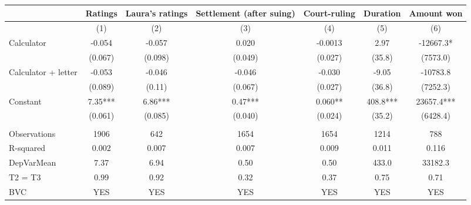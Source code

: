 \begin{tabular}{lcccccc}
\toprule
      & Ratings & Laura's ratings & Settlement (after suing) & Court-ruling & Duration & Amount won \\
\midrule
      & (1)   & (2)   & (3)   & (4)   & (5)   & (6) \\
\midrule
\midrule
Calculator & -0.054 & -0.057 & 0.020 & -0.0013 & 2.97  & -12667.3* \\
      & (0.067) & (0.098) & (0.049) & (0.027) & (35.8) & (7573.0) \\
Calculator + letter & -0.053 & -0.046 & -0.046 & -0.030 & -9.05 & -10783.8 \\
      & (0.089) & (0.11) & (0.067) & (0.027) & (36.8) & (7252.3) \\
Constant & 7.35*** & 6.86*** & 0.47*** & 0.060** & 408.8*** & 23657.4*** \\
      & (0.061) & (0.085) & (0.040) & (0.024) & (35.2) & (6428.4) \\
      &       &       &       &       &       &  \\
\midrule
Observations & 1906  & 642   & 1654  & 1654  & 1214  & 788 \\
R-squared & 0.002 & 0.007 & 0.007 & 0.009 & 0.011 & 0.116 \\
DepVarMean & 7.37  & 6.94  & 0.50  & 0.50  & 433.0 & 33182.3 \\
T2 = T3 & 0.99  & 0.92  & 0.32  & 0.37  & 0.75  & 0.71 \\
BVC   & YES   & YES   & YES   & YES   & YES   & YES \\
\bottomrule
\bottomrule
\end{tabular}%
